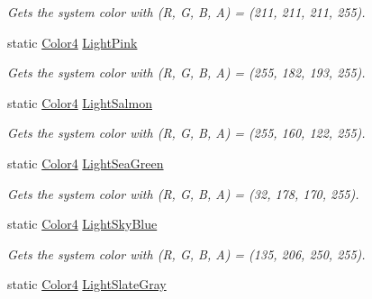 \begin{DoxyCompactItemize}
\begin{DoxyCompactList}\small\item\em Gets the system color with (R, G, B, A) = (211, 211, 211, 255). \end{DoxyCompactList}\item 
static \hyperlink{struct_open_t_k_1_1_graphics_1_1_color4}{Color4} \hyperlink{struct_open_t_k_1_1_graphics_1_1_color4_a4f44dbcb3460b09022d7278d17a393cd}{Light\-Pink}
\begin{DoxyCompactList}\small\item\em Gets the system color with (R, G, B, A) = (255, 182, 193, 255). \end{DoxyCompactList}\item 
static \hyperlink{struct_open_t_k_1_1_graphics_1_1_color4}{Color4} \hyperlink{struct_open_t_k_1_1_graphics_1_1_color4_ac9fdf1a6201c2a7a35423fdf70362138}{Light\-Salmon}
\begin{DoxyCompactList}\small\item\em Gets the system color with (R, G, B, A) = (255, 160, 122, 255). \end{DoxyCompactList}\item 
static \hyperlink{struct_open_t_k_1_1_graphics_1_1_color4}{Color4} \hyperlink{struct_open_t_k_1_1_graphics_1_1_color4_a658732da3f382d4d12b82b88a3e5a67b}{Light\-Sea\-Green}
\begin{DoxyCompactList}\small\item\em Gets the system color with (R, G, B, A) = (32, 178, 170, 255). \end{DoxyCompactList}\item 
static \hyperlink{struct_open_t_k_1_1_graphics_1_1_color4}{Color4} \hyperlink{struct_open_t_k_1_1_graphics_1_1_color4_a0d24ea7e63f0cfecf17110f99d7e852a}{Light\-Sky\-Blue}
\begin{DoxyCompactList}\small\item\em Gets the system color with (R, G, B, A) = (135, 206, 250, 255). \end{DoxyCompactList}\item 
static \hyperlink{struct_open_t_k_1_1_graphics_1_1_color4}{Color4} \hyperlink{struct_open_t_k_1_1_graphics_1_1_color4_ac7b3d7238740f59af4d7d2d45ae13517}{Light\-Slate\-Gray}

\end{DoxyCompactItemize}

